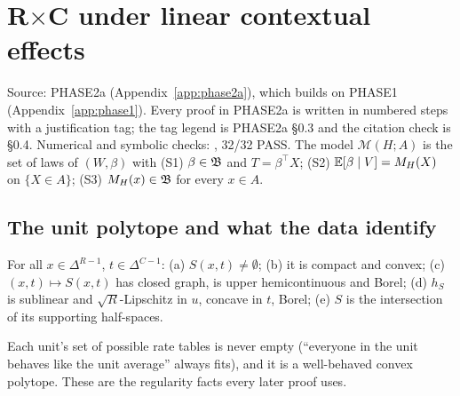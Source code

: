 \section{R$\times$C under linear contextual effects}\label{sec:rxc}

Source: PHASE2a (Appendix~\ref{app:phase2a}), which builds on PHASE1
(Appendix~\ref{app:phase1}). Every proof in PHASE2a is written in numbered
steps with a justification tag; the tag legend is PHASE2a \S0.3 and the citation
check is \S0.4. Numerical and symbolic checks: ,
32/32 PASS. The model $\mathcal M(H;A)$ is the set of laws of $(W,\beta)$ with
(S1) $\beta\in\mathfrak B$ and $T=\beta^\top X$; (S2) $\mathbb E[\beta\mid V]=M_H(X)$ on
$\{X\in A\}$; (S3) $M_H(x)\in\mathfrak B$ for every $x\in A$.

\subsection{The unit polytope and what the data identify}

\begin{result}\label{res:p2a-l0}
 For all $x\in\Delta^{R-1}$, $t\in\Delta^{C-1}$: (a)
$S(x,t)\ne\emptyset$; (b) it is compact and convex; (c) $(x,t)\mapsto S(x,t)$ has
closed graph, is upper hemicontinuous and Borel; (d) $h_S$ is sublinear and
$\sqrt R$-Lipschitz in $u$, concave in $t$, Borel; (e) $S$ is the intersection
of its supporting half-spaces.
\end{result}
\begin{plain}
Each unit's set of possible rate tables is never empty (``everyone in the unit
behaves like the unit average'' always fits), and it is a well-behaved convex
polytope. These are the regularity facts every later proof uses.
\end{plain}

